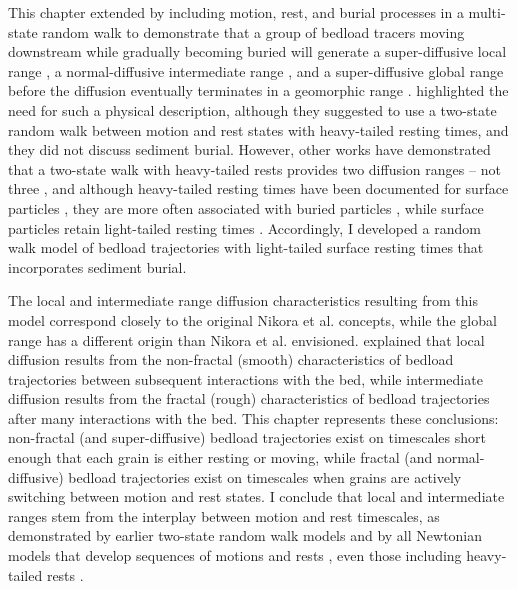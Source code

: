 This chapter \DIFaddbegin {}\DIFaddend extended \citet{Einstein1937} by including motion, rest, and burial processes in a multi-state random walk \citep{Weiss1994,Weeks1998} to demonstrate that a group of bedload tracers moving downstream while gradually becoming buried will generate a super-diffusive local range \citep{Martin2012,Fathel2016,Witz2018}, a normal-diffusive intermediate range \citep{Nakagawa1976,Yano1969}, and a super-diffusive global range \citep{Bradley2017, Bradley2010} \DIFdelbegin \DIFdel{, }\DIFdelend before the diffusion eventually terminates in a geomorphic range \citep{Hassan2017}.
\citet{Nikora2002} highlighted the need for such a physical description, although they suggested to use a two-state random walk between motion and rest states with heavy-tailed resting times, and they did not discuss sediment burial.
However, other works have demonstrated that a two-state walk with heavy-tailed rests provides two diffusion ranges -- not three \citep{Weeks1996,Fan2016}, and although heavy-tailed resting times have been documented for surface particles \citep{Liu2019,Fraccarollo2019}, they are more often associated with buried particles \citep{Martin2012,Martin2014,Voepel2013,Olinde2015,Pelosi2016, Pierce2020a}, while surface particles retain light-tailed resting times \citep{Einstein1937,Yano1969,Ancey2006,Nakagawa1976}.
Accordingly, I developed a random walk model of bedload trajectories with light-tailed surface resting times that incorporates sediment burial.

The local and intermediate range diffusion characteristics resulting from this model correspond closely to the original Nikora et al. concepts, while the global range has a different origin than Nikora et al. envisioned.
\citet{Nikora2001a} explained that local diffusion results from the non-fractal (smooth) characteristics of bedload trajectories between subsequent interactions with the bed,  while intermediate diffusion results from the fractal (rough) characteristics of bedload trajectories after many interactions with the bed.
This chapter represents these conclusions: non-fractal (and super-diffusive) bedload trajectories exist on timescales short enough that each grain is either resting or moving, while fractal (and normal-diffusive) bedload trajectories exist on timescales when grains are actively switching between motion and rest states.
I conclude that local and intermediate ranges stem from the interplay between motion and rest timescales, as demonstrated by earlier two-state random walk models \citep{Lisle1998,Lajeunesse2017} and by all Newtonian models that develop sequences of motions and rests \citep{Nikora2001a, Bialik2012}, even those including heavy-tailed rests \citep{Fan2016}.

